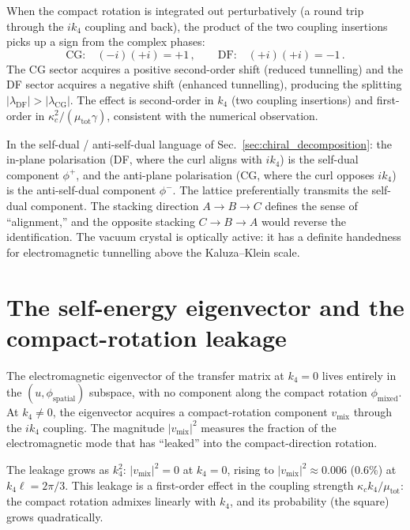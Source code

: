 When the compact rotation is integrated out perturbatively (a round trip through the $ik_4$ coupling and back), the product of the two coupling insertions picks up a sign from the complex phases:
\begin{equation}
\text{CG:}\quad (-i)(+i) = +1\,,\qquad
\text{DF:}\quad (+i)(+i) = -1\,.
\label{eq:sign_product}
\end{equation}
The CG sector acquires a positive second-order shift (reduced tunnelling) and the DF sector acquires a negative shift (enhanced tunnelling), producing the splitting $|\lambda_{\text{DF}}| > |\lambda_{\text{CG}}|$.  The effect is second-order in $k_4$ (two coupling insertions) and first-order in $\kappa_c^2/(\mu_{\text{tot}}\gamma)$, consistent with the numerical observation.

In the self-dual / anti-self-dual language of Sec.~\ref{sec:chiral_decomposition}: the in-plane polarisation (DF, where the curl aligns with $ik_4$) is the self-dual component $\phi^+$, and the anti-plane polarisation (CG, where the curl opposes $ik_4$) is the anti-self-dual component $\phi^-$.  The lattice preferentially transmits the self-dual component.  The stacking direction $A \to B \to C$ defines the sense of ``alignment,'' and the opposite stacking $C \to B \to A$ would reverse the identification.  The vacuum crystal is optically active: it has a definite handedness for electromagnetic tunnelling above the Kaluza--Klein scale.


\section{The self-energy eigenvector and the compact-rotation leakage}
\label{sec:self_energy_leakage}

The electromagnetic eigenvector of the transfer matrix at $k_4 = 0$ lives entirely in the $(u, \phi_{\text{spatial}})$ subspace, with no component along the compact rotation $\phi_{\text{mixed}}$.  At $k_4 \neq 0$, the eigenvector acquires a compact-rotation component $v_{\text{mix}}$ through the $ik_4$ coupling.  The magnitude $|v_{\text{mix}}|^2$ measures the fraction of the electromagnetic mode that has ``leaked'' into the compact-direction rotation.

The leakage grows as $k_4^2$: $|v_{\text{mix}}|^2 = 0$ at $k_4 = 0$, rising to $|v_{\text{mix}}|^2 \approx 0.006$ ($0.6\%$) at $k_4\ell = 2\pi/3$.  This leakage is a first-order effect in the coupling strength $\kappa_c k_4/\mu_{\text{tot}}$: the compact rotation admixes linearly with $k_4$, and its probability (the square) grows quadratically.

